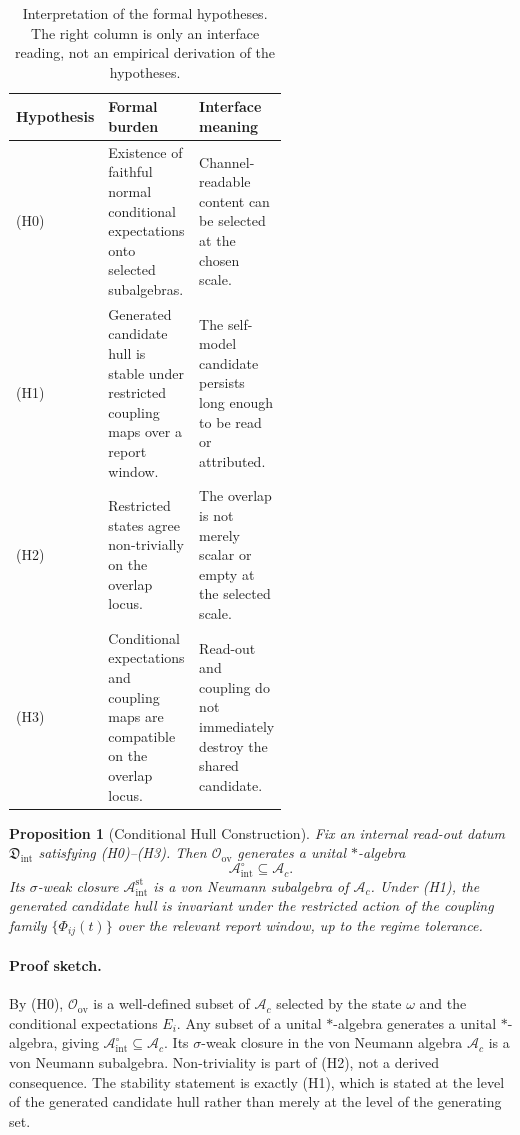 \documentclass[12pt]{article}
\newtheorem{proposition}{Proposition}[section]
\theoremstyle{definition}
\theoremstyle{remark}
\newcommand{\Ac}{\mathcal A_c}
\newcommand{\Bint}{\mathcal A_{\mathrm{int}}^{\mathrm{st}}}
\newcommand{\Bintpre}{\mathcal A_{\mathrm{int}}^{\circ}}
\begin{document}
\begin{table}[H]
\centering
\small
\begin{tabularx}{0.98\linewidth}{P{0.16\linewidth}P{0.38\linewidth}Y}
\toprule
\textbf{Hypothesis} & \textbf{Formal burden} & \textbf{Interface meaning} \\
\midrule
(H0) &
Existence of faithful normal conditional expectations onto selected subalgebras. &
Channel-readable content can be selected at the chosen scale. \\
(H1) &
Generated candidate hull is stable under restricted coupling maps over a report window. &
The self-model candidate persists long enough to be read or attributed. \\
(H2) &
Restricted states agree non-trivially on the overlap locus. &
The overlap is not merely scalar or empty at the selected scale. \\
(H3) &
Conditional expectations and coupling maps are compatible on the overlap locus. &
Read-out and coupling do not immediately destroy the shared candidate. \\
\bottomrule
\end{tabularx}
\caption{Interpretation of the formal hypotheses. The right column is
only an interface reading, not an empirical derivation of the
hypotheses.}
\end{table}

\begin{proposition}[Conditional Hull Construction]
\label{prop:hull-construction-main}
Fix an internal read-out datum \(\mathfrak D_{\mathrm{int}}\) satisfying
(H0)--(H3). Then \(\mathcal O_{\mathrm{ov}}\) generates a unital
\(*\)-algebra
\[
\Bintpre\subseteq\Ac.
\]
Its \(\sigma\)-weak closure \(\Bint\) is a von Neumann subalgebra of
\(\Ac\). Under (H1), the generated candidate hull is invariant under the
restricted action of the coupling family \(\{\Phi_{ij}(t)\}\) over the
relevant report window, up to the regime tolerance.
\end{proposition}

\paragraph{Proof sketch.}
By (H0), \(\mathcal O_{\mathrm{ov}}\) is a well-defined subset of
\(\Ac\) selected by the state \(\omega\) and the conditional
expectations \(E_i\). Any subset of a unital \(*\)-algebra generates a
unital \(*\)-algebra, giving \(\Bintpre\subseteq\Ac\). Its
\(\sigma\)-weak closure in the von Neumann algebra \(\Ac\) is a von
Neumann subalgebra. Non-triviality is part of (H2), not a derived
consequence. The stability statement is exactly (H1), which is stated at
the level of the generated candidate hull rather than merely at the
level of the generating set.
\end{document}
